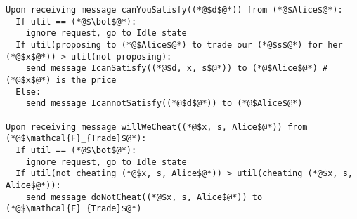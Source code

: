 \begin{lstlisting}[label=satprot, style=numbers]
Upon receiving message canYouSatisfy((*@$d$@*)) from (*@$Alice$@*):
  If util == (*@$\bot$@*):
    ignore request, go to Idle state
  If util(proposing to (*@$Alice$@*) to trade our (*@$s$@*) for her (*@$x$@*)) > util(not proposing):
    send message IcanSatisfy((*@$d, x, s$@*)) to (*@$Alice$@*) # (*@$x$@*) is the price
  Else:
    send message IcannotSatisfy((*@$d$@*)) to (*@$Alice$@*)

Upon receiving message willWeCheat((*@$x, s, Alice$@*)) from (*@$\mathcal{F}_{Trade}$@*):
  If util == (*@$\bot$@*):
    ignore request, go to Idle state
  If util(not cheating (*@$x, s, Alice$@*)) > util(cheating (*@$x, s, Alice$@*)):
    send message doNotCheat((*@$x, s, Alice$@*)) to (*@$\mathcal{F}_{Trade}$@*)
\end{lstlisting}
